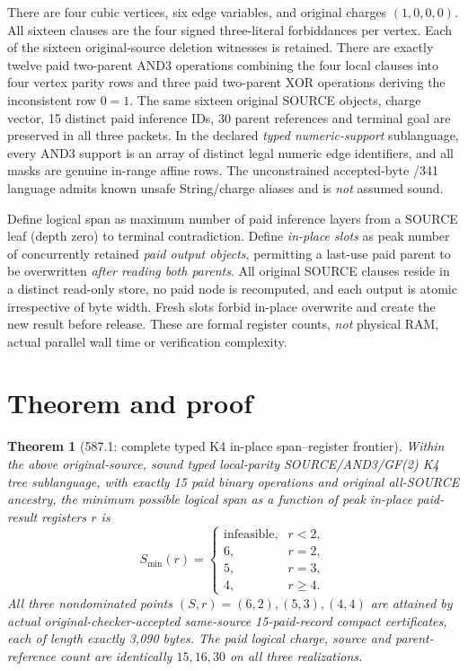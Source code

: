 \documentclass[11pt]{article}
\newtheorem{theorem}{Theorem}
\begin{document}
There are four cubic vertices, six edge variables, and original charges $(1,0,0,0)$. All sixteen clauses are the four signed three-literal forbiddances per vertex. Each of the sixteen original-source deletion witnesses is retained. There are exactly twelve paid two-parent AND3 operations combining the four local clauses into four vertex parity rows and three paid two-parent XOR operations deriving the inconsistent row $0=1$. The same sixteen original SOURCE objects, charge vector, 15 distinct paid inference IDs, 30 parent references and terminal goal are preserved in all three packets. In the declared \emph{typed numeric-support} sublanguage, every AND3 support is an array of distinct legal numeric edge identifiers, and all masks are genuine in-range affine rows. The unconstrained accepted-byte /341 language admits known unsafe String/charge aliases and is \emph{not} assumed sound.

Define logical span as maximum number of paid inference layers from a SOURCE leaf (depth zero) to terminal contradiction. Define \emph{in-place slots} as peak number of concurrently retained \emph{paid output objects}, permitting a last-use paid parent to be overwritten \emph{after reading both parents}. All original SOURCE clauses reside in a distinct read-only store, no paid node is recomputed, and each output is atomic irrespective of byte width. Fresh slots forbid in-place overwrite and create the new result before release. These are formal register counts, \emph{not} physical RAM, actual parallel wall time or verification complexity.

\section*{Theorem and proof}
\begin{theorem}[587.1: complete typed K4 in-place span--register frontier]
Within the above original-source, sound typed local-parity SOURCE/AND3/GF(2) K4 tree sublanguage, with exactly 15 paid binary operations and original all-SOURCE ancestry, the minimum possible logical span as a function of peak in-place paid-result registers $r$ is
\[
\boxed{
S_{\min}(r)=
\begin{cases}
\text{infeasible},& r<2,\\
6,&r=2,\\
5,&r=3,\\
4,&r\ge4.
\end{cases}}
\]
All three nondominated points $(S,r)=(6,2),(5,3),(4,4)$ are attained by actual original-checker-accepted \emph{same-source} 15-paid-record compact certificates, each of length exactly 3,090 bytes. The paid logical charge, source and parent-reference count are identically $15,16,30$ on all three realizations.
\end{theorem}
\end{document}
